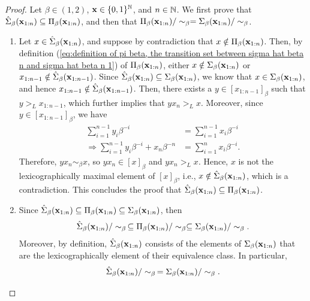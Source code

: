 \begin{proof}
    Let $\beta \in (1,2)$, ${\bf x} \in \{0,1\}^{\mathbb{N}}$, and $n \in \mathbb{N}$. We first prove that $\hat\Sigma_\beta({\bf x}_{1:n}) \subseteq \Pi_\beta({\bf x}_{1:n})$, and then that $\Pi_\beta({\bf x}_{1:n})/ \sim_\beta = \Sigma_\beta({\bf x}_{1:n})/ \sim_\beta$.
    \begin{enumerate}[label=(\alph*)]
        \item Let $x \in \hat\Sigma_\beta({\bf x}_{1:n})$, and suppose by contradiction that $x \notin \Pi_\beta({\bf x}_{1:n})$. Then, by definition (\ref{eq:definition of pi beta, the transition set between sigma hat beta n and sigma hat beta n 1}) of $\Pi_\beta({\bf x}_{1:n})$, either $x \notin \Sigma_\beta({\bf x}_{1:n})$ or $x_{1:n-1} \notin  \hat \Sigma_\beta({\bf x}_{1:n-1})$. Since $\hat\Sigma_\beta({\bf x}_{1:n}) \subseteq \Sigma_\beta({\bf x}_{1:n})$, we know that $x \in \Sigma_\beta({\bf x}_{1:n})$, and hence $x_{1:n-1} \notin  \hat \Sigma_\beta({\bf x}_{1:n-1})$. Then, there exists a $y \in [x_{1:n-1}]_\beta$ such that $y >_L x_{1:n-1}$, which further implies that $yx_n >_L x$. Moreover, since $y \in [x_{1:n-1}]_\beta$, we have 
        \begin{align}
            \sum_{i=1}^{n-1} y_i \beta^{-i} &= \sum_{i=1}^{n-1} x_i \beta^{-i}\\
            \Rightarrow \sum_{i=1}^{n-1} y_i \beta^{-i} + x_n \beta^{-n} &= \sum_{i=1}^{n} x_i \beta^{-i}.
        \end{align}
        Therefore, $yx_n \sim_\beta x$, so $yx_n \in [x]_\beta$ and $yx_n >_L x$. Hence, $x$ is not the lexicographically maximal element of $[x]_\beta$, i.e., $x \notin \hat\Sigma_\beta({\bf x}_{1:n})$, which is a contradiction. This concludes the proof that $\hat\Sigma_\beta({\bf x}_{1:n}) \subseteq \Pi_\beta({\bf x}_{1:n})$.
        \item Since $\hat \Sigma_\beta({\bf x}_{1:n}) \subseteq \Pi_\beta({\bf x}_{1:n}) \subseteq \Sigma_\beta({\bf x}_{1:n})$, then 
        \begin{equation}
            \hat \Sigma_\beta({\bf x}_{1:n}) / \sim_\beta \, \subseteq \Pi_\beta({\bf x}_{1:n}) / \sim_\beta \subseteq \Sigma_\beta({\bf x}_{1:n}) / \sim_\beta.
        \end{equation}
        Moreover, by definition, $\hat \Sigma_\beta({\bf x}_{1:n})$ consists of the elements of $\Sigma_\beta({\bf x}_{1:n})$ that are the lexicographically element of their equivalence class. In particular,
        \begin{equation}
            \hat \Sigma_\beta({\bf x}_{1:n}) / \sim_\beta \, = \Sigma_\beta({\bf x}_{1:n})/ \sim_\beta.
        \end{equation}

\end{enumerate}
\end{proof}
